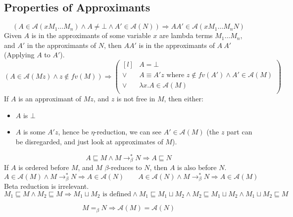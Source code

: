\subsection{Properties of Approximants}
\[(A \in \mathcal{A}(xM_1\dots M_n) \land A \neq \bot \land A' \in \mathcal{A}(N) ) \Rightarrow A A' \in \mathcal{A}(x M_1 \dots M_n N)\]
Given $A$ is in the approximants of some variable $x$ are lambda terms $M_1 \dots M_n$, and $A'$ in the approximants of $N$, then $A A'$ is in the approximants of $A \ A'$ (Applying $A$ to $A'$).
\vspace{5mm}
\[(A \in \mathcal{A}(Mz) \land z \not\in fv(M) ) \Rightarrow \left( \begin{matrix*}[l]
			& A = \bot \\
			\lor & A \equiv A'z \text{ where } z \not\in fv(A') \land A' \in \mathcal{A}(M) \\
			\lor & \lambda x. A \in \mathcal{A}(M) \\
		\end{matrix*} \right)\]
If $A$ is an approximant of $Mz$, and $z$ is not free in $M$, then either:
\begin{itemize}
	\item $A$ is $\bot$
	\item $A$ is some $A'z$, hence be $\eta$-reduction, we can see $A' \in \mathcal{A}(M)$ (the $z$ part can be disregarded, and just look at approximates of $M$).
\end{itemize}
\vspace{5mm}
\[A \sqsubseteq M \land M \to^*_\beta N \Rightarrow A \sqsubseteq N\]
If $A$ is ordered before $M$, and $M$ $\beta$-reduces to $N$, then $A$ is also before $N$.
\vspace{5mm}
\[A \in \mathcal{A}(M) \land M \to^*_\beta N \Rightarrow A \in \mathcal{A}(N) \qquad A \in \mathcal{A}(N) \land M \to^*_\beta N \Rightarrow A \in \mathcal{A}(M)\]
Beta reduction is irrelevant.
\[M_1 \sqsubseteq M \land M_2 \sqsubseteq M \Rightarrow M_1 \sqcup M_2 \text{ is defined} \land M_1 \sqsubseteq M_1 \sqcup M_2 \land M_2 \sqsubseteq M_1 \sqcup M_2 \land M_1 \sqcup M_2 \sqsubseteq M \]

\[M =_\beta N \Rightarrow \mathcal{A}(M) = \mathcal{A}(N)\]


